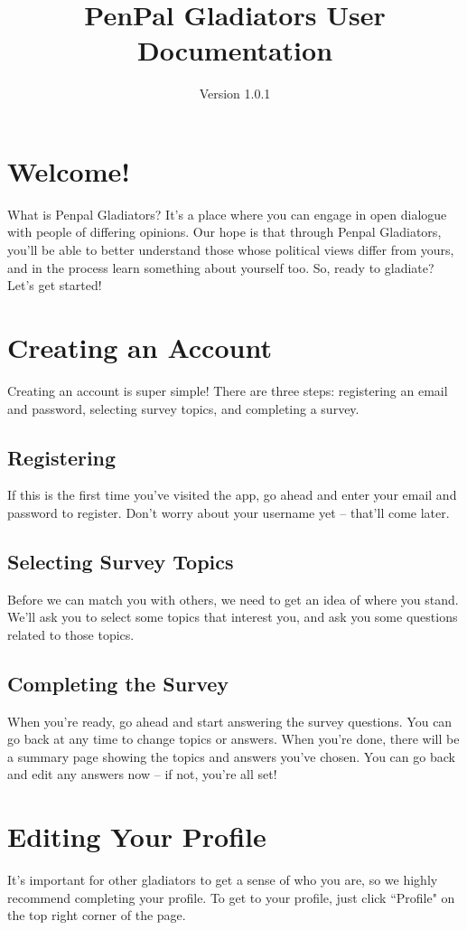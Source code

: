 \documentclass[12pt]{article}
\title{PenPal Gladiators User Documentation}
\author{Version 1.0.1}
\begin{document}
\maketitle
\tableofcontents

\section{Welcome!}
What is Penpal Gladiators? It's a place where you can engage in open dialogue
with people of differing opinions. Our hope is that through Penpal Gladiators,
you'll be able to better understand those whose political views differ from
yours, and in the process learn something about yourself too. So, ready to
gladiate? Let's get started!

\section{Creating an Account}
Creating an account is super simple! There are three steps: registering an email
and password, selecting survey topics, and completing a survey.

\subsection{Registering}
If this is the first time you've visited the app, go ahead and enter your email
and password to register.  Don't worry about your username yet -- that'll come
later.

\subsection{Selecting Survey Topics}
Before we can match you with others, we need to get an idea of where you stand.
We'll ask you to select some topics that interest you, and ask you some
questions related to those topics.

\subsection{Completing the Survey}
When you're ready, go ahead and start answering the survey questions. You can go
back at any time to change topics or answers. When you're done, there will be a
summary page showing the topics and answers you've chosen. You can go back and
edit any answers now – if not, you're all set!

\section{Editing Your Profile}
It's important for other gladiators to get a sense of who you are, so we highly
recommend completing your profile. To get to your profile, just click ``Profile"
on the top right corner of the page.\\
\end{document}
